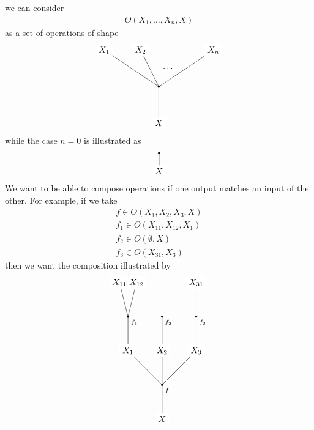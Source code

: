 we can consider
\begin{align*}
  O(X_{1},\ldots,X_{n},X)
\end{align*}
as a set of operations of shape
\[
\begin{tikzpicture}[scale=0.75]
  \filldraw
    (0,0) node[fill=white] {$X$}
    --
    (0,2) circle (1.5pt) node[below right] {};
  \draw
    (0,2)
    --
    (-3,4) node[fill=white] {$X_{1}$};
  \draw
    (0,2)
    --
    (-1,4) node[fill=white] {$X_{2}$};
  \draw
    (0.5,3)
    --
    (0.5,3) node[fill=white] {$\ldots$};
  \draw
    (0,2)
    --
    (3,4) node[fill=white] {$X_{n}$};
\end{tikzpicture}
\]
while the case $n = 0$ is illustrated as
\[
\begin{tikzpicture}[scale=0.75]
  \filldraw
    (0,0) node[fill=white] {$X$}
    --
    (0,1) circle (1.5pt) node[below right] {};
\end{tikzpicture}
\]
We want to be able to compose operations if one output matches an input of the other. For example, if we take
\begin{align*}
  f
  \in
  O(X_{1},X_{2},X_{3},X)
  \\
  f_{1}
  \in
  O(X_{11},X_{12},X_{1})
  \\
  f_{2}
  \in
  O(\emptyset,X)
  \\
  f_{3}
  \in
  O(X_{31},X_{3})
\end{align*}
then we want the composition illustrated by
\[
\begin{tikzpicture}[scale=0.70]
  \filldraw
    (0,0) node[fill=white] {$X$}
    --
    (0,2) circle (1.5pt) node[below right] {\scriptsize{$f$}};
  \draw
    (0,2)
    --
    (-2,4) node[fill=white] {$X_{1}$};
  \draw
    (0,2)
    --
    (0,4) node[fill=white] {$X_{2}$};
  \draw
    (0,2)
    --
    (2,4) node[fill=white] {$X_{3}$};
  \filldraw
    (-2,4) node[fill=white] {$X_{1}$}
    --
    (-2,6)
    circle (1.5pt) node[below right] {\scriptsize{$f_{1}$}};
  \draw
    (-2,6)
    --
    (-2.5,8) node[fill=white] {$X_{11}$};
  \draw
    (-2,6)
    --
    (-1.5,8) node[fill=white] {$X_{12}$};
  \filldraw
    (0,4) node[fill=white] {$X_{2}$}
    --
    (0,6) circle (1.5pt) node[below right] {\scriptsize{$f_{2}$}};
  \filldraw
    (2,4) node[fill=white] {$X_{3}$}
    --
    (2,6) circle (1.5pt) node[below right] {\scriptsize{$f_{3}$}};
  \draw
    (2,6)
    --
    (2,8) node[fill=white] {$X_{31}$};
\end{tikzpicture}
\]

